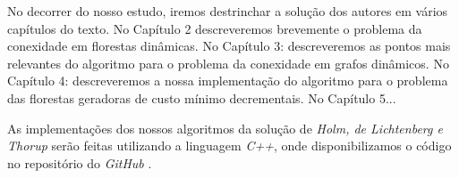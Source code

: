 No decorrer do nosso estudo, iremos destrinchar a solução dos autores em vários capítulos do texto. No Capítulo 2 descreveremos brevemente o problema da conexidade em florestas dinâmicas. No Capítulo 3: descreveremos as pontos mais relevantes do algoritmo para o problema da conexidade em grafos dinâmicos. No Capítulo 4: descreveremos a nossa implementação do algoritmo para o problema das florestas geradoras de custo mínimo decrementais. No Capítulo 5...

As implementações dos nossos algoritmos da solução de \textit{Holm, de Lichtenberg e Thorup} \cite{jacob_holm} serão feitas utilizando a linguagem \textit{C++}, onde disponibilizamos o código no repositório do \textit{GitHub} \cite{chung2025}.